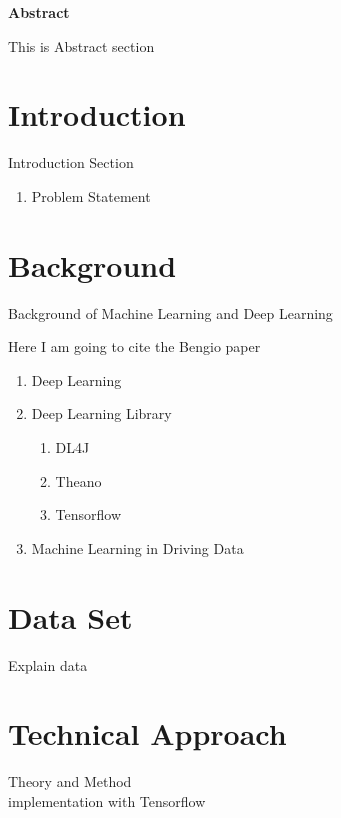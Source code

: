 \documentclass[12pt]{article}
\begin{document}
\maketitle

\begin{center}
\textbf{Abstract}
\end{center}
\noindent
This is Abstract section


\section{Introduction}
Introduction Section
\begin{enumerate}
\item Problem Statement
\end{enumerate}


\section{Background}
Background of Machine Learning and Deep Learning

Here I am going to cite the Bengio paper \cite{bengio2009learning}

\begin{enumerate}
\item Deep Learning\\

\item Deep Learning Library\\
	\begin{enumerate}
	\item DL4J\\
	\item Theano\\
	\item Tensorflow\\
	\end{enumerate}

\item Machine Learning in Driving Data\\
\end{enumerate}


\section{Data Set}
Explain data\\


\section{Technical Approach}
Theory and Method\\
implementation with Tensorflow\\
\end{document}
